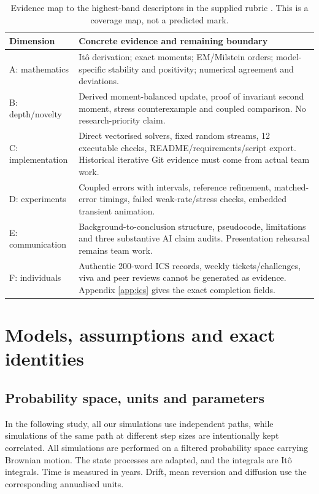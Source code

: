 \begin{table}[ht]\centering\small
\caption{Evidence map to the highest-band descriptors in the supplied rubric \cite{rubric}. This is a coverage map, not a predicted mark.}
\begin{tabular}{>{\raggedright\arraybackslash}p{.13\linewidth}>{\raggedright\arraybackslash}p{.79\linewidth}}\toprule
Dimension & Concrete evidence and remaining boundary\\\midrule
A: mathematics & It\^o derivation; exact moments; EM/Milstein orders; model-specific stability and positivity; numerical agreement and deviations.\\
B: depth/novelty & Derived moment-balanced update, proof of invariant second moment, stress counterexample and coupled comparison. No research-priority claim.\\
C: implementation & Direct vectorised solvers, fixed random streams, 12 executable checks, README/requirements/script export. Historical iterative Git evidence must come from actual team work.\\
D: experiments & Coupled errors with intervals, reference refinement, matched-error timings, failed weak-rate/stress checks, embedded transient animation.\\
E: communication & Background-to-conclusion structure, pseudocode, limitations and three substantive AI claim audits. Presentation rehearsal remains team work.\\
F: individuals & Authentic 200-word ICS records, weekly tickets/challenges, viva and peer reviews cannot be generated as evidence. Appendix \ref{app:ics} gives the exact completion fields.\\\bottomrule
\end{tabular}
\end{table}

\section{Models, assumptions and exact identities}
\label{sec:model}

\subsection{Probability space, units and parameters}

In the following study, all our simulations use independent paths, while simulations of the same path at different step sizes are intentionally kept correlated. All simulations are performed on a filtered probability space carrying Brownian motion. The state processes are adapted, and the integrals are It\^o integrals. Time is measured in years. Drift, mean reversion and diffusion use the corresponding annualised units.

